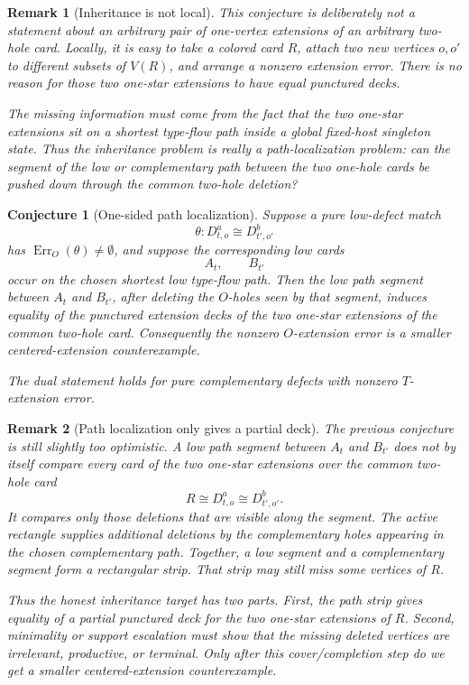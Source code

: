\documentclass[11pt]{article}
\newtheorem{conjecture}{Conjecture}
\newtheorem{remark}{Remark}
\newcommand{\Err}{\operatorname{Err}}
\begin{document}
\begin{remark}[Inheritance is not local]
This conjecture is deliberately not a statement about an arbitrary pair of
one-vertex extensions of an arbitrary two-hole card.  Locally, it is easy to
take a colored card \(R\), attach two new vertices \(o,o'\) to different
subsets of \(V(R)\), and arrange a nonzero extension error.  There is no
reason for those two one-star extensions to have equal punctured decks.

The missing information must come from the fact that the two one-star
extensions sit on a shortest type-flow path inside a global fixed-host
singleton state.  Thus the inheritance problem is really a path-localization
problem: can the segment of the low or complementary path between the two
one-hole cards be pushed down through the common two-hole deletion?
\end{remark}

\begin{conjecture}[One-sided path localization]
Suppose a pure low-defect match
\[
  \theta:D_{t,o}^a\cong D_{t',o'}^b
\]
has \(\Err_O(\theta)\neq\emptyset\), and suppose the corresponding low cards
\[
  A_t,\qquad B_{t'}
\]
occur on the chosen shortest low type-flow path.  Then the low path segment
between \(A_t\) and \(B_{t'}\), after deleting the \(O\)-holes seen by that
segment, induces equality of the punctured extension decks of the two
one-star extensions of the common two-hole card.  Consequently the nonzero
\(O\)-extension error is a smaller centered-extension counterexample.

The dual statement holds for pure complementary defects with nonzero
\(T\)-extension error.
\end{conjecture}

\begin{remark}[Path localization only gives a partial deck]
The previous conjecture is still slightly too optimistic.  A low path segment
between \(A_t\) and \(B_{t'}\) does not by itself compare every card of the
two one-star extensions over the common two-hole card
\[
  R \cong D_{t,o}^a\cong D_{t',o'}^b.
\]
It compares only those deletions that are visible along the segment.  The
active rectangle supplies additional deletions by the complementary holes
appearing in the chosen complementary path.  Together, a low segment and a
complementary segment form a rectangular strip.  That strip may still miss
some vertices of \(R\).

Thus the honest inheritance target has two parts.  First, the path strip gives
equality of a \emph{partial} punctured deck for the two one-star extensions of
\(R\).  Second, minimality or support escalation must show that the missing
deleted vertices are irrelevant, productive, or terminal.  Only after this
cover/completion step do we get a smaller centered-extension counterexample.
\end{remark}
\end{document}
